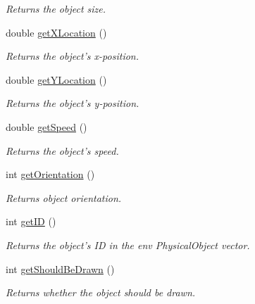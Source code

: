 \begin{DoxyCompactItemize}
\begin{DoxyCompactList}\small\item\em Returns the object size. \end{DoxyCompactList}\item 
\hypertarget{classPhysicalObjectClass_a17eb882028d4b3a95d0fee9f13ce2f5f}{double \hyperlink{classPhysicalObjectClass_a17eb882028d4b3a95d0fee9f13ce2f5f}{get\-X\-Location} ()}\label{classPhysicalObjectClass_a17eb882028d4b3a95d0fee9f13ce2f5f}

\begin{DoxyCompactList}\small\item\em Returns the object's x-\/position. \end{DoxyCompactList}\item 
double \hyperlink{classPhysicalObjectClass_a43b08ed49c8ea7c51660b85b1a8e64d6}{get\-Y\-Location} ()
\begin{DoxyCompactList}\small\item\em Returns the object's y-\/position. \end{DoxyCompactList}\item 
double \hyperlink{classPhysicalObjectClass_a778e1ed4b802bfb06382d0b15c09fd29}{get\-Speed} ()
\begin{DoxyCompactList}\small\item\em Returns the object's speed. \end{DoxyCompactList}\item 
int \hyperlink{classPhysicalObjectClass_aa93fef3df933484b3f12bfd09825842f}{get\-Orientation} ()
\begin{DoxyCompactList}\small\item\em Returns object orientation. \end{DoxyCompactList}\item 
int \hyperlink{classPhysicalObjectClass_a73e1b1feb39c9d9252b0e2ef282a9e33}{get\-I\-D} ()
\begin{DoxyCompactList}\small\item\em Returns the object's I\-D in the env Physical\-Object vector. \end{DoxyCompactList}\item 
int \hyperlink{classPhysicalObjectClass_aefb21e5558080baee0f88fa67b1f231a}{get\-Should\-Be\-Drawn} ()
\begin{DoxyCompactList}\small\item\em Returns whether the object should be drawn. \end{DoxyCompactList}\end{DoxyCompactItemize}

